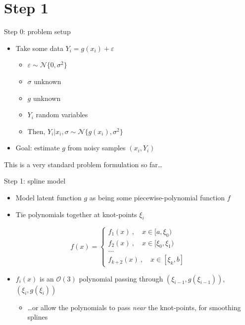 \documentclass[presentation]{beamer}
\begin{document}
\section{Step 1}
\label{sec:org2934df8}
\begin{frame}[label={sec:org6a095b3}]{Step 0: problem setup}
\begin{itemize}
\item Take some data \(Y_i = g(x_i) + \varepsilon\)
\begin{itemize}
\item \(\varepsilon\sim\mathcal{N}\{0, \sigma^2\}\)
\item \(\sigma\) unknown
\item \(g\) unknown
\item \(Y_i\) random variables
\item Then, \(Y_i|x_i, \sigma\sim\mathcal{N}\{g(x_i), \sigma^2\}\)
\end{itemize}
\end{itemize}
\vfill
\begin{itemize}
\item Goal: estimate \(g\) from noisy samples \((x_i, Y_i)\)
\end{itemize}
\vfill
This is a very standard problem formulation so far\ldots{}
\end{frame}

\begin{frame}[label={sec:org818d3a3}]{Step 1: spline model}
\begin{itemize}
\item Model latent function \(g\) as being some piecewise-polynomial function \(f\)
\item Tie polynomials together at knot-points \(\xi_i\)
\end{itemize}

\begin{equation}
f(x) = 
    \begin{cases}
        f_1(x)~, \quad x\in[a,\xi_0)\\
	f_2(x)~, \quad x\in[\xi_0, \xi_1)\\
	\dots \\
	f_{k+2}(x)~,\quad x\in[\xi_k, b]
    \end{cases}
\end{equation}

\begin{itemize}
\item \(f_i(x)\) is an \(\mathcal{O}(3)\) polynomial passing through \((\xi_{i-1},g(\xi_{i-1}))\), \((\xi_i, g(\xi_i))\)
\begin{itemize}
\item \ldots{}or allow the polynomials to pass \emph{near} the knot-points, for smoothing splines
\end{itemize}
\end{itemize}
\end{frame}
\end{document}
